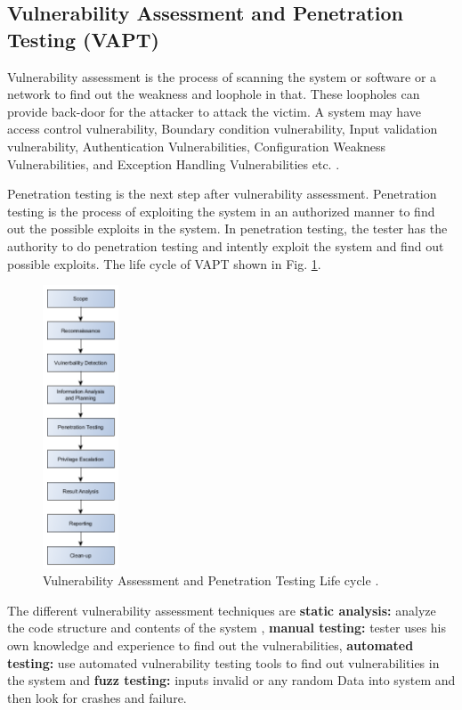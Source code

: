 \documentclass[pdftex,english,oribibl]{llncs}
\begin{document}
\subsection{Vulnerability Assessment and Penetration Testing (VAPT)}
Vulnerability assessment is the process of scanning the system or software or a network to find out the weakness and loophole in that. These loopholes can provide back-door for the  attacker to attack the victim. A system may have access control vulnerability, Boundary condition vulnerability, Input validation vulnerability, Authentication Vulnerabilities, Configuration Weakness Vulnerabilities, and Exception Handling Vulnerabilities etc. \cite{GOEL2015710}.

Penetration testing is the next step after vulnerability assessment. Penetration testing is the process of exploiting the system in an authorized manner to find out the possible exploits in the system. In penetration testing, the tester has the authority to do penetration testing and intently exploit the system and find out possible exploits. The life cycle of VAPT shown in Fig. \ref{fig:vapt_lifecycle}.

\begin{figure}[h]
	\centering\includegraphics[width=0.2\textwidth]{figures/vapt_lifecycle.png}
	\caption{Vulnerability Assessment and Penetration Testing Life cycle \cite{GOEL2015710}.}
	\label{fig:vapt_lifecycle}
\end{figure}

The different vulnerability assessment techniques are \textbf{static analysis:} analyze the code structure and contents of the system , \textbf{manual testing:} tester uses his own knowledge and experience to find out the vulnerabilities, \textbf{automated testing:} use automated vulnerability testing tools to find out vulnerabilities in the system and \textbf{fuzz testing:} inputs invalid or any random Data into system and then look for crashes and failure.
\end{document}
